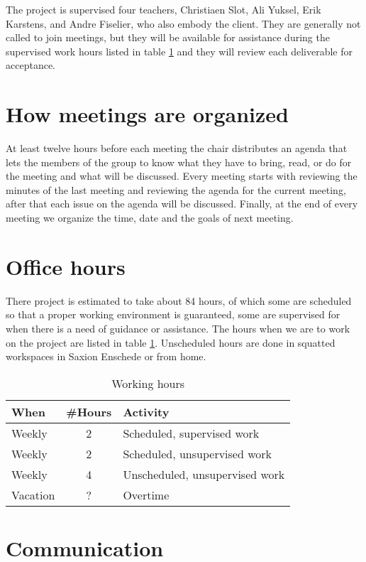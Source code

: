 The project is supervised four teachers, Christiaen Slot, Ali Yuksel, Erik Karstens, and Andre Fiselier, who also embody the client. They are generally not called to join meetings, but they will be available for assistance during the supervised work hours listed in table \ref{tbl:workhours} and they will review each deliverable for acceptance.

\section{How meetings are organized}
At least twelve hours before each meeting the chair distributes an agenda that lets the members of the group to know what they have to bring, read, or do for the meeting and what will be discussed. Every meeting starts with reviewing the minutes of the last meeting and reviewing the agenda for the current meeting, after that each issue on the agenda will be discussed. Finally, at the end of every meeting we organize the time, date and the goals of next meeting.  

\section{Office hours}

There project is estimated to take about 84 hours, of which some are scheduled so that a proper working environment is guaranteed, some are supervised for when there is a need of guidance or assistance. The hours when we are to work on the project are listed in table \ref{tbl:workhours}. Unscheduled hours are done in squatted workspaces in Saxion Enschede or from home.

\begin{table}
\centering
\caption{Working hours}
\begin{tabular}{lcl}
\\
When & \#Hours & Activity \\
\hline
Weekly & 2 & Scheduled, supervised work \\
Weekly & 2 & Scheduled, unsupervised work \\
Weekly & 4 & Unscheduled, unsupervised work \\
Vacation & ? & Overtime \\
\end{tabular}
\label{tbl:workhours}
\end{table} 

\section{Communication}

